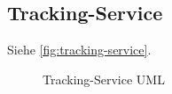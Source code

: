 \subsection{Tracking-Service}
Siehe \autoref{fig:tracking-service}.
\begin{figure}[h]
    \centering
    \caption{Tracking-Service UML}
    \label{fig:tracking-service}
\end{figure}


